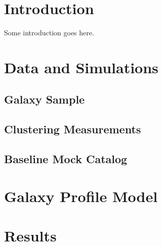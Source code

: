 \documentclass[usenatbib,usegraphicx,letterpaper]{mn2e}
\begin{document}
\section{Introduction}
\label{sec:intro}
Some introduction goes here.

\section{Data and Simulations}
\label{sec:data}

\subsection{Galaxy Sample}
\label{subsec:galaxydata}

\subsection{Clustering Measurements}
\label{subsec:clusteringmeasurements}

\subsection{Baseline Mock Catalog}
\label{subsec:baselinemock}

\section{Galaxy Profile Model}
\label{sec:model}

\section{Results}
\label{sec:results}
\end{document}
